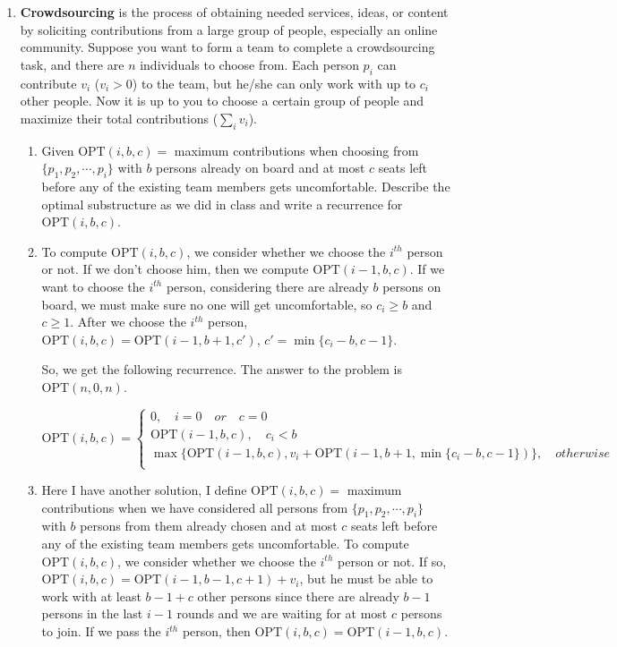 \documentclass[12pt,a4paper]{article}
\makeatletter
\newtheorem*{solution}{Solution}
\theoremstyle{definition}
\renewenvironment{solution}[1][Solution] {\par\pushQED{\qed}\normalfont\topsep6\p@\@plus6\p@\relax\trivlist\item[\hskip\labelsep\bfseries#1\@addpunct{.}]\ignorespaces}{\popQED\endtrivlist\@endpefalse} \makeatother
\makeatother
\begin{document}
\begin{enumerate}
\begin{enumerate}
\end{enumerate}

\newpage
\item
\textbf{Crowdsourcing} is the process of obtaining needed services, ideas, or content by soliciting contributions from a large group of people, especially an online community. Suppose you want to form a team to complete a crowdsourcing task, and there are $n$ individuals to choose from. Each person $p_i$ can contribute $v_i$ ($v_i > 0$) to the team, but he/she can only work with up to $c_i$ other people. Now it is up to you to choose a certain group of people and maximize their total contributions ($\sum_i{v_i}$).

\begin{enumerate}
\item
Given $\text{OPT}(i, b, c)=$ maximum contributions when choosing from $\{p_1, p_2, \cdots, p_i\}$ with $b$ persons already on board and at most $c$ seats left before any of the existing team members gets uncomfortable. Describe the optimal substructure as we did in class and write a recurrence for $\text{OPT}(i, b, c)$.

\begin{solution}
	To compute $\text{OPT}(i,b,c)$, we consider whether we choose the $i^{th}$ person or not. If we don't choose him, then we compute $\text{OPT}(i-1,b,c)$. If we want to choose the $i^{th}$ person, considering there are already $b$ persons on board, we must make sure no one will get uncomfortable, so $c_i\geq b$ and $c\geq 1$. After we choose the $i^{th}$ person, $\text{OPT}(i,b,c)=\text{OPT}(i-1,b+1,c')$, $c'=\min\{c_i-b,c-1\}$.
	
	So, we get the following recurrence. The answer to the problem is $\text{OPT}(n,0,n)$.
	
	$$\text{OPT}(i,b,c)=\begin{cases}
	0,\quad i=0\quad or\quad c=0\\
	\text{OPT}(i-1,b,c),\quad c_i<b\quad\\
	\max\{\text{OPT}(i-1,b,c),v_i+\text{OPT}(i-1,b+1,\min\{c_i-b,c-1\})\},\quad otherwise\\
	\end{cases}$$
	
\end{solution}

\begin{solution} 
	Here I have another solution, I define $\text{OPT}(i, b, c)=$ maximum contributions when we have considered all persons from $\{p_1, p_2, \cdots, p_i\}$ with $b$ persons from them already chosen and at most $c$ seats left before any of the existing team members gets uncomfortable. To compute $\text{OPT}(i,b,c)$, we consider whether we choose the $i^{th}$ person or not. If so, $\text{OPT}(i,b,c)=\text{OPT}(i-1,b-1,c+1)+v_i$, but he must be able to work with at least $b-1+c$ other persons since there are already $b-1$ persons in the last $i-1$ rounds and we are waiting for at most $c$ persons to join. If we pass the $i^{th}$ person, then $\text{OPT}(i,b,c)=\text{OPT}(i-1,b,c)$.
	

\end{solution}
\end{enumerate}
\end{enumerate}
\end{document}
